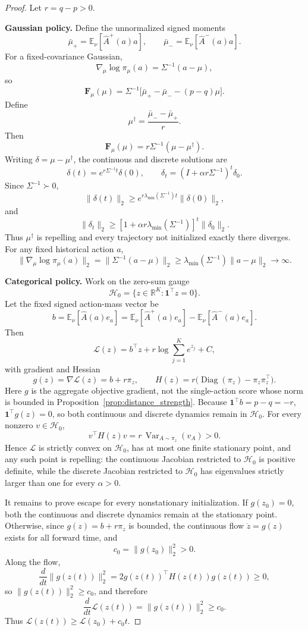 \documentclass{article}
\theoremstyle{plain}
\theoremstyle{definition}
\theoremstyle{remark}
\begin{document}
\begin{proof}
Let \(r=q-p>0\).

\medskip
\noindent\textbf{Gaussian policy.}
Define the unnormalized signed moments
\[
\bar\mu_+
=
\mathbb E_\nu[\widehat A^+(a)a],
\qquad
\bar\mu_-
=
\mathbb E_\nu[\widehat A^-(a)a].
\]
For a fixed-covariance Gaussian,
\[
\nabla_\mu\log\pi_\mu(a)
=
\Sigma^{-1}(a-\mu),
\]
so
\[
\mathbf F_\mu(\mu)
=
\Sigma^{-1}
\bigl[\bar\mu_+-\bar\mu_--(p-q)\mu\bigr].
\]
Define
\[
\mu^\dagger
=
\frac{\bar\mu_--\bar\mu_+}{r}.
\]
Then
\[
\mathbf F_\mu(\mu)
=
r\Sigma^{-1}(\mu-\mu^\dagger).
\]
Writing \(\delta=\mu-\mu^\dagger\), the continuous and discrete
solutions are
\[
\delta(t)
=
e^{r\Sigma^{-1}t}\delta(0),
\qquad
\delta_t
=
\left(I+\alpha r\Sigma^{-1}\right)^t\delta_0.
\]
Since \(\Sigma^{-1}\succ0\),
\[
\|\delta(t)\|_2
\ge
e^{r\lambda_{\min}(\Sigma^{-1})t}\|\delta(0)\|_2,
\]
and
\[
\|\delta_t\|_2
\ge
\left[
1+\alpha r\lambda_{\min}(\Sigma^{-1})
\right]^t
\|\delta_0\|_2.
\]
Thus \(\mu^\dagger\) is repelling and every trajectory not initialized
exactly there diverges. For any fixed historical action \(a\),
\[
\|\nabla_\mu\log\pi_\mu(a)\|_2
=
\|\Sigma^{-1}(a-\mu)\|_2
\ge
\lambda_{\min}(\Sigma^{-1})\|a-\mu\|_2
\longrightarrow\infty.
\]

\medskip
\noindent\textbf{Categorical policy.}
Work on the zero-sum gauge
\[
\mathcal H_0
=
\{z\in\mathbb R^K:\mathbf1^\top z=0\}.
\]
Let the fixed signed action-mass vector be
\[
b
=
\mathbb E_\nu[\widehat A(a)e_a]
=
\mathbb E_\nu[\widehat A^+(a)e_a]
-
\mathbb E_\nu[\widehat A^-(a)e_a].
\]
Then
\[
\mathcal L(z)
=
b^\top z
+
r\log\sum_{j=1}^K e^{z_j}
+
C,
\]
with gradient and Hessian
\[
g(z)
=
\nabla\mathcal L(z)
=
b+r\pi_z,
\qquad
H(z)
=
r\bigl(\operatorname{Diag}(\pi_z)-\pi_z\pi_z^\top\bigr).
\]
Here \(g\) is the aggregate objective gradient, not the single-action
score whose norm is bounded in Proposition~\ref{prop:distance_strength}.
Because
\(\mathbf1^\top b=p-q=-r\),
\(\mathbf1^\top g(z)=0\), so both continuous and discrete dynamics remain
in \(\mathcal H_0\). For every nonzero \(v\in\mathcal H_0\),
\[
v^\top H(z)v
=
r\,\operatorname{Var}_{A\sim\pi_z}(v_A)
>
0.
\]
Hence \(\mathcal L\) is strictly convex on \(\mathcal H_0\), has at most
one finite stationary point, and any such point is repelling: the
continuous Jacobian restricted to \(\mathcal H_0\) is positive
definite, while the discrete Jacobian restricted to \(\mathcal H_0\)
has eigenvalues strictly larger than one for every \(\alpha>0\).

It remains to prove escape for every nonstationary initialization. If
\(g(z_0)=0\), both the continuous and discrete dynamics remain at the
stationary point. Otherwise, since \(g(z)=b+r\pi_z\) is bounded, the
continuous flow \(\dot z=g(z)\) exists for all forward time, and
\[
c_0=\|g(z_0)\|_2^2>0.
\]
Along the flow,
\[
\frac{d}{dt}\|g(z(t))\|_2^2
=
2g(z(t))^\top H(z(t))g(z(t))
\ge0,
\]
so \(\|g(z(t))\|_2^2\ge c_0\), and therefore
\[
\frac{d}{dt}\mathcal L(z(t))
=
\|g(z(t))\|_2^2
\ge c_0.
\]
Thus \(\mathcal L(z(t))\ge\mathcal L(z_0)+c_0t\).


\end{proof}
\end{document}
